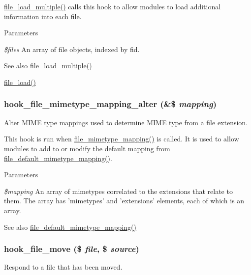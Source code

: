 \hyperlink{group__file_ga32afa29695b6da3f5d86cad18f063bfc}{file\_\-load\_\-multiple()} calls this hook to allow modules to load additional information into each file.


\begin{DoxyParams}{Parameters}
\item[{\em \$files}]An array of file objects, indexed by fid.\end{DoxyParams}
\begin{DoxySeeAlso}{See also}
\hyperlink{group__file_ga32afa29695b6da3f5d86cad18f063bfc}{file\_\-load\_\-multiple()} 

\hyperlink{group__file_ga138bd2e393c743b41a642003eecbf98f}{file\_\-load()} 
\end{DoxySeeAlso}
\hypertarget{group__hooks_gaac5bb0122941c0b10df08d65ec358e99}{
\subsubsection[{hook\_\-file\_\-mimetype\_\-mapping\_\-alter}]{\setlength{\rightskip}{0pt plus 5cm}hook\_\-file\_\-mimetype\_\-mapping\_\-alter (\&\$ {\em mapping})}}
\label{group__hooks_gaac5bb0122941c0b10df08d65ec358e99}
Alter MIME type mappings used to determine MIME type from a file extension.

This hook is run when \hyperlink{file_8mimetypes_8inc_a92dcd553bb93d58cd4e25c1dc64c7386}{file\_\-mimetype\_\-mapping()} is called. It is used to allow modules to add to or modify the default mapping from \hyperlink{file_8mimetypes_8inc_a8a8064ffcafb048d0c7dd61ba261b876}{file\_\-default\_\-mimetype\_\-mapping()}.


\begin{DoxyParams}{Parameters}
\item[{\em \$mapping}]An array of mimetypes correlated to the extensions that relate to them. The array has 'mimetypes' and 'extensions' elements, each of which is an array.\end{DoxyParams}
\begin{DoxySeeAlso}{See also}
\hyperlink{file_8mimetypes_8inc_a8a8064ffcafb048d0c7dd61ba261b876}{file\_\-default\_\-mimetype\_\-mapping()} 
\end{DoxySeeAlso}
\hypertarget{group__hooks_ga7053514a7a923b43960b31cacfa9ce95}{
\subsubsection[{hook\_\-file\_\-move}]{\setlength{\rightskip}{0pt plus 5cm}hook\_\-file\_\-move (\$ {\em file}, \/  \$ {\em source})}}
\label{group__hooks_ga7053514a7a923b43960b31cacfa9ce95}
Respond to a file that has been moved.


